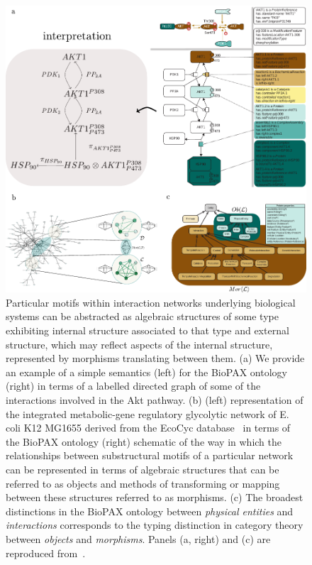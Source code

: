 \documentclass[aps,twocolumn]{revtex4-1}
\begin{document}
\begin{figure}
\noindent\includegraphics[width=2\columnwidth]{fig/Fig1Composite.pdf}
\caption{Particular motifs within interaction networks underlying biological systems can be abstracted as algebraic structures of some type exhibiting internal structure associated to that type and external structure, which may reflect aspects of the internal structure, represented by morphisms translating between them. (a) We provide an example of a simple semantics (left) for the BioPAX ontology~\cite{Demir2010} (right) in terms of a labelled directed graph of some of the interactions involved in the Akt pathway. (b) (left) representation of the integrated metabolic-gene regulatory glycolytic network of E. coli K12 MG1655 derived from the EcoCyc database~\cite{Keseler2011} in terms of the BioPAX ontology (right) schematic of the way in which the relationships between substructural motifs of a particular network can be represented in terms of algebraic structures that can be referred to as objects and methods of transforming or mapping between these structures referred to as morphisms. (c) The broadest distinctions in the BioPAX ontology between {\it physical entities} and {\it interactions} corresponds to the typing distinction in category theory between {\it objects} and {\it morphisms}. Panels (a, right) and (c) are reproduced from~\cite{Demir2010}.}
\label{fig:biograph}
\end{figure}
\end{document}
